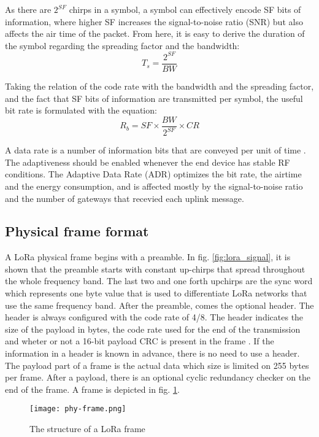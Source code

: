 As there are $ 2^{SF} $ chirps in a symbol, a symbol can effectively encode SF bits of information, where higher SF increases the signal-to-noise ratio (SNR) but also affects the air time of the packet.
From here, it is easy to derive the duration of the symbol regarding the spreading factor and the bandwidth:
\begin{equation}
    T_{s} = \frac{2^{SF}}{BW}
\end{equation}

Taking the relation of the code rate with the bandwidth and the spreading factor, and the fact that SF bits of information are transmitted per symbol, the useful bit rate is formulated with the equation:
\begin{equation}
    R_{b} = SF \times \frac{BW}{2^{SF}} \times CR 
\end{equation}

A data rate is a number of information bits that are conveyed per unit of time \cite{Silva_LoRaWAN}.
The adaptiveness should be enabled whenever the end device has stable RF conditions. 
The Adaptive Data Rate (ADR) optimizes the bit rate, the airtime and the energy consumption, and is affected mostly by the signal-to-noise ratio and the number of gateways that recevied each uplink message.

\subsection{Physical frame format}
A LoRa physical frame begins with a preamble. 
In fig. \ref{fig:lora_signal}, it is shown that the preamble starts with constant up-chirps that spread throughout the whole frequency band. The last two and one forth upchirps are the sync word which represents one byte value that is used to differentiate LoRa networks that use the same frequency band.
After the preamble, comes the optional header. The header is always configured with the code rate of 4/8.
The header indicates the size of the payload in bytes, the code rate used for the end of the transmission and wheter or not a 16-bit payload CRC is present in the frame \cite{Aloys_LoRa}.
If the information in a header is known in advance, there is no need to use a header.
The payload part of a frame is the actual data which size is limited on 255 bytes per frame.
After a payload, there is an optional cyclic redundancy checker on the end of the frame.
A frame is depicted in fig. \ref{fig:lora_phy_frame}.
\begin{figure}[h]
    \centering
    \texttt{[image: phy-frame.png]}
    \caption{The structure of a LoRa frame}
    \label{fig:lora_phy_frame}
\end{figure}

